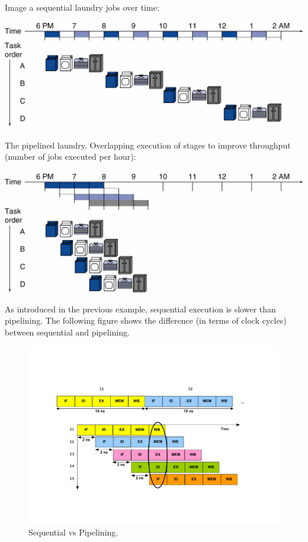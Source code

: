 \newpage

\begin{examplebox}
    Image a sequential laundry jobs over time:\cite{pipelining-slides}
    \begin{center}
        \centering
        \includegraphics[width=.9\textwidth]{img/pipelining-example-1.pdf}
    \end{center}
    The pipelined laundry. Overlapping execution of stages to improve throughput (number of jobs executed per hour):\cite{pipelining-slides}
    \begin{center}
        \centering
        \includegraphics[width=.9\textwidth]{img/pipelining-example-2.pdf}
    \end{center}
\end{examplebox}

\noindent
As introduced in the previous example, sequential execution is slower than pipelining. The following figure shows the difference (in terms of clock cycles) between sequential and pipelining.
\begin{figure}[!htp]
    \centering
    \includegraphics[width=\textwidth]{img/sequential-vs-pipelining-1.pdf}
    \caption{Sequential vs Pipelining.\cite{pipelining-slides}}
    \label{fig: sequential vs pipelining}
\end{figure}

